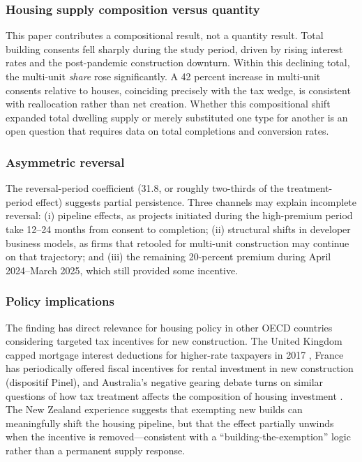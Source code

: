 \documentclass[12pt]{article}
\begin{document}
\subsubsection*{Housing supply composition versus quantity} This paper contributes a compositional result, not a quantity result. Total building consents fell sharply during the study period, driven by rising interest rates and the post-pandemic construction downturn. Within this declining total, the multi-unit \textit{share} rose significantly. A 42 percent increase in multi-unit consents relative to houses, coinciding precisely with the tax wedge, is consistent with reallocation rather than net creation. Whether this compositional shift expanded total dwelling supply or merely substituted one type for another is an open question that requires data on total completions and conversion rates.

\subsubsection*{Asymmetric reversal} The reversal-period coefficient (31.8, or roughly two-thirds of the treatment-period effect) suggests partial persistence. Three channels may explain incomplete reversal: (i) pipeline effects, as projects initiated during the high-premium period take 12--24 months from consent to completion; (ii) structural shifts in developer business models, as firms that retooled for multi-unit construction may continue on that trajectory; and (iii) the remaining 20-percent premium during April 2024--March 2025, which still provided some incentive.

\subsubsection*{Policy implications} The finding has direct relevance for housing policy in other OECD countries considering targeted tax incentives for new construction. The United Kingdom capped mortgage interest deductions for higher-rate taxpayers in 2017 \citep{HMRC2017}, France has periodically offered fiscal incentives for rental investment in new construction (dispositif Pinel), and Australia's negative gearing debate turns on similar questions of how tax treatment affects the composition of housing investment \citep{Daley2016}. The New Zealand experience suggests that exempting new builds can meaningfully shift the housing pipeline, but that the effect partially unwinds when the incentive is removed---consistent with a ``building-the-exemption'' logic rather than a permanent supply response.
\end{document}
